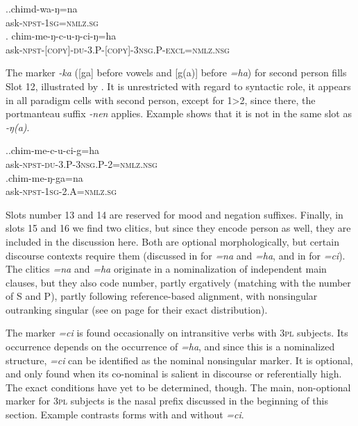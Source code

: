 	\ex.\ag.chimd-wa-ŋ=na\\
	ask{\scshape -npst-1sg=nmlz.sg}\\
	\bg. chim-me-ŋ-c-u-ŋ-ci-ŋ=ha\\
	ask{\scshape -npst-[copy]-du-3.P-[copy]-3nsg.P-excl=nmlz.nsg}\\
		
		
The marker \emph{-ka} ([ga] before vowels and [g(a)] before \emph{=ha}) for second person  fills Slot 12, illustrated by  \Next. It is unrestricted with regard to syntactic role, it appears in all paradigm cells with second person, except for 1>2, since there, the portmanteau suffix \emph{-nen} applies. Example \Next[b] shows that it is not in the same slot as \emph{-ŋ(a)}.

\ex.\ag.chim-me-c-u-ci-g=ha\\
	ask{\scshape -npst-du-3.P-3nsg.P-2=nmlz.nsg}\\
	\bg.chim-me-ŋ-ga=na\\
	ask{\scshape -npst-1sg-2.A=nmlz.sg}\\
	
	
Slots number 13 and 14 are reserved for mood and negation suffixes. Finally, in slots 15 and 16 we find two clitics, but since they encode person as well, they are included in the discussion here. Both are optional morphologically, but certain discourse contexts require them (discussed in  for \emph{=na} and \emph{=ha}, and in  for \emph{=ci}). The clitics \emph{=na} and \emph{=ha} originate in a nominalization of independent main clauses, but they also code number, partly ergatively (matching with the number of S and P), partly following reference-based alignment, with nonsingular outranking singular (see  on page \pageref{agr-tab} for their exact distribution).

The marker \emph{=ci} is found occasionally on intransitive verbs with {\scshape 3pl} subjects. Its occurrence depends on the occurrence of \emph{=ha}, and since this is a nominalized structure, \emph{=ci} can be identified as the nominal nonsingular marker.  It is optional, and only found when its co-nominal is salient in discourse or referentially high. The exact conditions have yet to be determined, though. The main, non-optional marker for {\scshape 3pl} subjects is the nasal prefix discussed in the beginning of this section. Example \Next contrasts forms with and without \emph{=ci}. 

